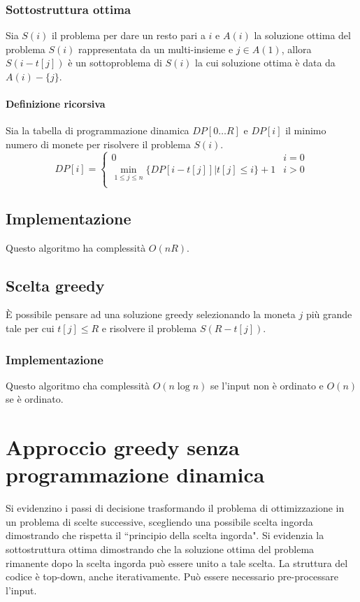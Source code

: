 \subsubsection{Sottostruttura ottima}
Sia $S(i)$ il problema per dare un resto pari a $i$ e $A(i)$ la soluzione ottima del problema $S(i)$ rappresentata da un multi-insieme e $j\in A(1)$, allora $S(i-t[j])$ \`e un 
sottoproblema di $S(i)$ la cui soluzione ottima \`e data da $A(i)-\{j\}$. 
\paragraph{Definizione ricorsiva}
Sia la tabella di programmazione dinamica $DP[0\dots R]$ e $DP[i]$ il minimo numero di monete per risolvere il problema $S(i)$.
$$DP[i] = \begin{cases}
	0 & i = 0 \\
	\min\limits_{1\le j\le n}\{DP[i-t[j]] | t[j]\le i\} + 1 & i>0\\
\end{cases}$$
\subsection{Implementazione}

Questo algoritmo ha complessit\`a $O(nR)$. 
\subsection{Scelta greedy}
\`E possibile pensare ad una soluzione greedy selezionando la moneta $j$ pi\`u grande tale per cui $t[j]\le R$ e risolvere il problema $S(R - t[j])$. 
\subsubsection{Implementazione}

Questo algoritmo cha complessit\`a $O(n\log n)$ se l'input non \`e ordinato e $O(n)$ se \`e ordinato.
\section{Approccio greedy senza programmazione dinamica}
Si evidenzino i passi di decisione trasformando il problema di ottimizzazione in un problema di scelte successive, scegliendo una possibile scelta ingorda dimostrando che rispetta il
``principio della scelta ingorda". Si evidenzia la sottostruttura ottima dimostrando che la soluzione ottima del problema rimanente dopo la scelta ingorda pu\`o essere unito a tale
scelta. La struttura del codice \`e top-down, anche iterativamente. Pu\`o essere necessario pre-processare l'input. 
